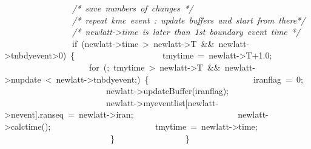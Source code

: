 {\ \ \ \ \ \ \ \ \ \ \ \ \ \ \ \ \textsl{/*\ save\ numbers\ of\ changes\ */}
\ \ \ \ \ \ \ \ \ \ \ \ \ \ \ \ \textsl{/*\ repeat\ kmc\ event\ :\ update\ buffers\ and\ start\ from\ there*/}
\ \ \ \ \ \ \ \ \ \ \ \ \ \ \ \ \textsl{/*\ newlatt-{}>{}time\ is\ later\ than\ 1st\ boundary\ event\ time\ */}
\ \ \ \ \ \ \ \ \ \ \ \ \ \ \ \ if\ (newlatt-{}>{}time\ >{}\ newlatt-{}>{}T\ \&\&\ newlatt-{}>{}tnbdyevent>{}0)\ \{
\ \ \ \ \ \ \ \ \ \ \ \ \ \ \ \ \ \ \ \ tmytime\ =\ newlatt-{}>{}T+1.0;
\ \ \ \ \ \ \ \ \ \ \ \ \ \ \ \ \ \ \ \ for\ (;\ tmytime\ >{}\ newlatt-{}>{}T\ \&\&\ newlatt-{}>{}nupdate\ <{}\ newlatt-{}>{}tnbdyevent;)\ \{
\ \ \ \ \ \ \ \ \ \ \ \ \ \ \ \ \ \ \ \ \ \ \ \ iranflag\ =\ 0;
\ \ \ \ \ \ \ \ \ \ \ \ \ \ \ \ \ \ \ \ \ \ \ \ newlatt-{}>{}updateBuffer(iranflag);
\ \ \ \ \ \ \ \ \ \ \ \ \ \ \ \ \ \ \ \ \ \ \ \ newlatt-{}>{}myeventlist[newlatt-{}>{}nevent].ranseq\ =\ newlatt-{}>{}iran;
\ \ \ \ \ \ \ \ \ \ \ \ \ \ \ \ \ \ \ \ \ \ \ \ newlatt-{}>{}calctime();
\ \ \ \ \ \ \ \ \ \ \ \ \ \ \ \ \ \ \ \ \ \ \ \ tmytime\ =\ newlatt-{}>{}time;
\ \ \ \ \
\ \ \ \ \ \ \ \ \ \ \ \ \ \ \ \ \ \ \ \ \}
\ \ \ \ \ \ \ \ \ \ \ \ \ \ \ \ \}

}
